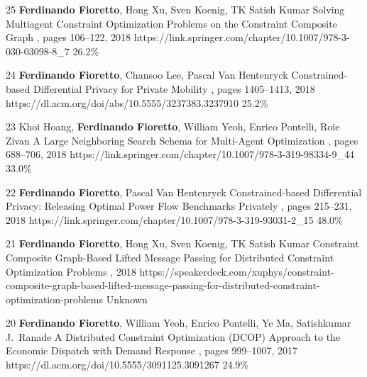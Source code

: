 \begin{pubs}
\confentry 
		{25} %
		{{\bf Ferdinando Fioretto}, Hong Xu, Sven Koenig, TK Satish Kumar}
	 	{Solving Multiagent Constraint Optimization Problems on the Constraint Composite Graph}
		{\procPRIMA, pages 106--122, 2018}
		{https://link.springer.com/chapter/10.1007/978-3-030-03098-8\_7}
	    {26.2\%} %

	\confentry
		{24} %
	  	{{\bf Ferdinando Fioretto}, Chansoo Lee, Pascal Van Hentenryck}
	  	{Constrained-based Differential Privacy for Private Mobility} 
	  	{\procAAMAS, pages 1405--1413, 2018}
	  	{https://dl.acm.org/doi/abs/10.5555/3237383.3237910}
	    {25.2\%} %

	\confentry 
		{23} %
		{Khoi Hoang, {\bf Ferdinando Fioretto}, William Yeoh, Enrico Pontelli, Roie Zivan}
		{A Large Neighboring Search Schema for Multi-Agent Optimization}
		{\procCP, pages 688--706, 2018}
		{https://link.springer.com/chapter/10.1007/978-3-319-98334-9\_44}
	    {33.0\%} %

	\confentry 
		{22} %
		{{\bf Ferdinando Fioretto}, Pascal Van Hentenryck}
		{Constrained-based Differential Privacy: Releasing Optimal Power Flow Benchmarks Privately} 
		{\procCPAIOR, pages 215--231, 2018}
		{https://link.springer.com/chapter/10.1007/978-3-319-93031-2\_15}
	    {48.0\%}

	\confentry
		{21} %
		{{\bf Ferdinando Fioretto}, Hong Xu, Sven Koenig, TK Satish Kumar}
		{Constraint Composite Graph-Based Lifted Message Passing for Distributed Constraint Optimization Problems}
		{\procISIAM, 2018}
		{https://speakerdeck.com/xuphys/constraint-composite-graph-based-lifted-message-passing-for-distributed-constraint-optimization-problems}
		{Unknown}

\confentry 
		{20} %
		{{\bf Ferdinando Fioretto}, William Yeoh, Enrico Pontelli, Ye Ma, Satishkumar J.~Ranade}
		{A Distributed Constraint Optimization (DCOP) Approach to the Economic Dispatch with Demand Response}
		{\procAAMAS, pages  999--1007, 2017}
		{https://dl.acm.org/doi/10.5555/3091125.3091267}
		{24.9\%}%


\end{pubs}
